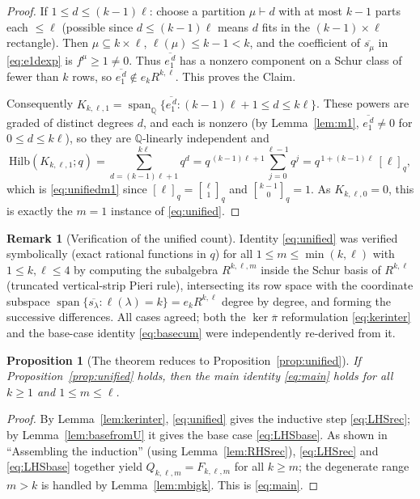 \documentclass{amsart}
\newtheorem{proposition}{Proposition}
\theoremstyle{definition}
\newtheorem{remark}{Remark}
\newcommand{\Hilb}{\mathrm{Hilb}}
\newcommand{\qbin}[2]{\genfrac{[}{]}{0pt}{}{#1}{#2}_q}
\newcommand{\Q}{\mathbb{Q}}
\newcommand{\rkl}{R^{k,\ell}}
\newcommand{\Rklm}{R^{k,\ell,m}}
\begin{document}
\begin{proof}
If $1\le d\le(k-1)\ell$: choose a partition $\mu\vdash d$ with at most $k-1$ parts each
$\le\ell$ (possible since $d\le(k-1)\ell$ means $d$ fits in the $(k-1)\times\ell$
rectangle). Then $\mu\subseteq k\times\ell$, $\ell(\mu)\le k-1<k$, and the coefficient
of $\overline{s_\mu}$ in \eqref{eq:e1dexp} is $f^\mu\ge1\ne0$. Thus
$\overline{e_1^{\,d}}$ has a nonzero component on a Schur class of fewer than $k$ rows,
so $\overline{e_1^{\,d}}\notin e_k\rkl$. This proves the Claim.

Consequently $K_{k,\ell,1}=\operatorname{span}_\Q\{\overline{e_1^{\,d}}:(k-1)\ell+1\le
d\le k\ell\}$. These powers are graded of distinct degrees $d$, and each is nonzero
(by Lemma~\ref{lem:m1}, $\overline{e_1^{\,d}}\ne0$ for $0\le d\le k\ell$), so they are
$\Q$-linearly independent and
\[
\Hilb(K_{k,\ell,1};q)=\sum_{d=(k-1)\ell+1}^{k\ell}q^{d}
=q^{\,(k-1)\ell+1}\sum_{j=0}^{\ell-1}q^{j}
=q^{\,1+(k-1)\ell}\,[\ell]_q ,
\]
which is \eqref{eq:unifiedm1} since $[\ell]_q=\qbin{\ell}{1}$ and $\qbin{k-1}{0}=1$.
As $K_{k,\ell,0}=0$, this is exactly the $m=1$ instance of \eqref{eq:unified}.
\end{proof}

\begin{remark}[Verification of the unified count]\label{rem:verifU}
Identity \eqref{eq:unified} was verified symbolically (exact rational functions in
$q$) for all $1\le m\le\min(k,\ell)$ with $1\le k,\ell\le4$ by computing the
subalgebra $\Rklm$ inside the Schur basis of $\rkl$ (truncated vertical-strip Pieri
rule), intersecting its row space with the coordinate subspace
$\operatorname{span}\{\overline{s_\lambda}:\ell(\lambda)=k\}=e_k\rkl$ degree by
degree, and forming the successive differences. All cases agreed; both the
$\ker\overline\pi$ reformulation \eqref{eq:kerinter} and the base-case identity
\eqref{eq:basecum} were independently re-derived from it.
\end{remark}

\begin{proposition}[The theorem reduces to Proposition~\ref{prop:unified}]
\label{prop:reduceall}
If Proposition~\ref{prop:unified} holds, then the main identity \eqref{eq:main} holds
for all $k\ge1$ and $1\le m\le\ell$.
\end{proposition}

\begin{proof}
By Lemma~\ref{lem:kerinter}, \eqref{eq:unified} gives the inductive step
\eqref{eq:LHSrec}; by Lemma~\ref{lem:basefromU} it gives the base case
\eqref{eq:LHSbase}. As shown in ``Assembling the induction'' (using
Lemma~\ref{lem:RHSrec}), \eqref{eq:LHSrec} and \eqref{eq:LHSbase} together yield
$Q_{k,\ell,m}=F_{k,\ell,m}$ for all $k\ge m$; the degenerate range $m>k$ is handled by
Lemma~\ref{lem:mbigk}. This is \eqref{eq:main}.
\end{proof}
\end{document}
